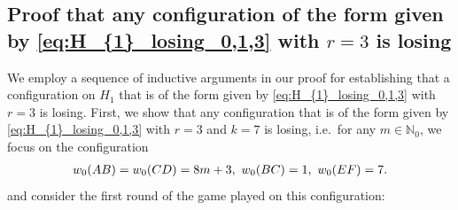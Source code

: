 \documentclass[11pt,reqno]{amsart}
\theoremstyle{definition}
\theoremstyle{definition}
\begin{document}
\subsection{Proof that any configuration of the form given by \eqref{eq:H_{1}_losing_0,1,3} with $r=3$ is losing}\label{subsec:H_{1}_losing_3_proof}
We employ a sequence of inductive arguments in our proof for establishing that a configuration on $H_{1}$ that is of the form given by \eqref{eq:H_{1}_losing_0,1,3} with $r=3$ is losing. First, we show that any configuration that is of the form given by \eqref{eq:H_{1}_losing_0,1,3} with $r=3$ and $k=7$ is losing, i.e.\ for any $m \in \mathbb{N}_{0}$, we focus on the configuration
\begin{align}
w_{0}(AB)=w_{0}(CD)=8m+3,\ w_{0}(BC)=1,\ w_{0}(EF)=7.\label{eq:H_{1}_losing_3_base_case}
\end{align}
and consider the first round of the game played on this configuration:
\end{document}
